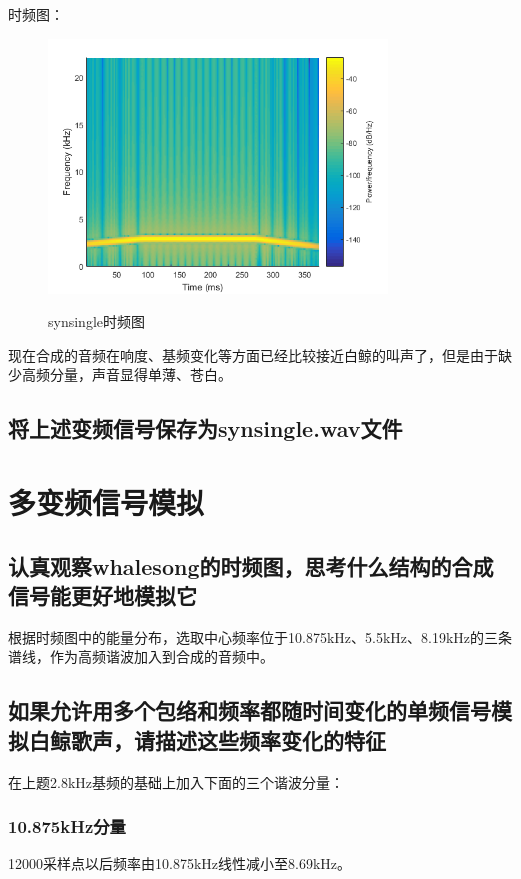 \documentclass{article}
\begin{document}
            时频图：
            \begin{figure}[H]
                \centering
                \includegraphics[width=9cm]{figure9.png}
                \label{fig:synsingle-ft}\caption{synsingle时频图}
            \end{figure}

            现在合成的音频在响度、基频变化等方面已经比较接近白鲸的叫声了，但是由于缺少高频分量，声音显得单薄、苍白。

        \subsection{将上述变频信号保存为synsingle.wav文件}

    \section{多变频信号模拟}
        \subsection{认真观察whalesong的时频图，思考什么结构的合成信号能更好地模拟它}
            根据时频图中的能量分布，选取中心频率位于10.875kHz、5.5kHz、8.19kHz的三条谱线，作为高频谐波加入到合成的音频中。

        \subsection{如果允许用多个包络和频率都随时间变化的单频信号模拟白鲸歌声，请描述这些频率变化的特征}
            在上题2.8kHz基频的基础上加入下面的三个谐波分量：
            \subsubsection*{10.875kHz分量}
                12000采样点以后频率由10.875kHz线性减小至8.69kHz。
\end{document}
